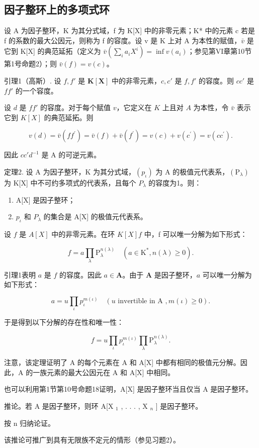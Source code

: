 \subsection{因子整环上的多项式环}

设 A 为因子整环，K 为其分式域，f 为 K{[}X{]} 中的非零元素；K* 中的元素 c 若是 f 的系数的最大公因元，则称为 f 的容度。设 v 是 K 上对 A 为本性的赋值，\(\bar{v}\) 是它到 K{[}X{]} 的典范延拓（定义为 \(\bar{v}\left(\sum_{i}a_{i}X^{i}\right)=\inf v(a_{i})\)；参见第VI章第10节第1号命题2）；则 \(\bar{v}(f)=v(c)\)。

引理1（高斯）. 设 \(f, f'\) 是 \(\mathbf{K}[\mathbf{X}]\) 中的非零元素，\(c, c'\) 是 \(f, f'\) 的容度。则 \(cc'\) 是 \(ff'\) 的一个容度。

设 \(d\) 是 \(ff'\) 的容度。对于每个赋值 \(v\)，它定义在 \(K\) 上且对 \(A\) 为本性，令 \(\bar{v}\) 表示它到 \(K[X]\) 的典范延拓。则

\[
v (d) = \bar {v} (f f ^ {\prime}) = \bar {v} (f) + \bar {v} (f ^ {\prime}) = v (c) + v (c ^ {\prime}) = v (c c ^ {\prime}).
\]

因此 \(cc'd^{-1}\) 是 A 的可逆元素。

定理2. 设 A 为因子整环，K 为其分式域，\((p_{\iota})\) 为 A 的极值元代表系，\((\mathrm{P}_{\lambda})\) 为 K{[}X{]} 中不可约多项式的代表系，且每个 \(P_{\lambda}\) 的容度为1。则：

\begin{enumerate}
\def\labelenumi{(\roman{enumi})}
\item
  A{[}X{]} 是因子整环；
\item
  \(p_{\iota}\) 和 \(P_{\lambda}\) 的集合是 A{[}X{]} 的极值元代表系。
\end{enumerate}

设 \(f\) 是 \(A[X]\) 中的非零元素。在环 \(K[X]f\) 中，f 可以唯一分解为如下形式：

\[
f = a \prod_ {\lambda} \mathrm{P} _ {\lambda} ^ {n (\lambda)} \quad (a \in \mathrm{K} ^ {*}, n (\lambda) \geqslant 0).
\]

引理1表明 \(a\) 是 \(f\) 的容度。因此 \(a \in \mathbf{A}\)。由于 \(\mathbf{A}\) 是因子整环，\(a\) 可以唯一分解为如下形式：

\[
a = u \prod_ {\iota} p _ {\iota} ^ {m (\iota)} \quad (u \text {   invertible   in   A }, m (\iota) \geqslant 0).
\]

于是得到以下分解的存在性和唯一性：

\[
f = u \prod_ {\iota} p _ {\iota} ^ {m (\iota)} \prod_ {\lambda} \mathrm{P} _ {\lambda} ^ {n (\lambda)}.
\]

注意，该定理证明了 A 的每个元素在 A 和 A{[}X{]} 中都有相同的极值元分解。因此，A 的一族元素的最大公因元在 A 和 A{[}X{]} 中相同。

也可以利用第1节第10号命题18证明，A{[}X{]} 是因子整环当且仅当 A 是因子整环。

推论。若 A 是因子整环，则环 A{[}X \(_{1}\) , . . . , X \(_{n}\) {]} 是因子整环。

按 n 归纳论证。

该推论可推广到具有无限族不定元的情形（参见习题2）。

